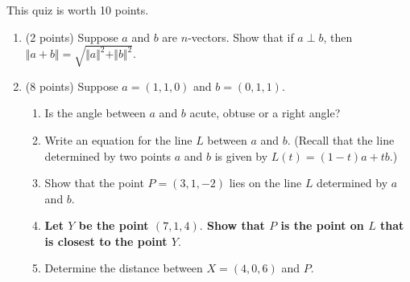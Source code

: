 \documentclass[11pt,fleqn]{article}
\begin{document}
\renewcommand{\headrulewidth}{0pt}
\newcommand{\blank}[1]{\rule{#1}{0.75pt}}
\renewcommand{\d}{\displaystyle}
This quiz is worth 10 points.
\begin{enumerate}
\item (2 points) Suppose $a$ and $b$ are $n$-vectors. Show that if $a \perp b$, then $\Vert a+b \Vert=\sqrt{\Vert a \Vert^2+\Vert b \Vert^2}.$
\vfill
\item (8 points) Suppose $a=(1,1,0)$ and $b=(0,1,1).$ 
 
	\begin{enumerate}
	\item Is the angle between $a$ and $b$ acute, obtuse or a right angle?
	\vspace{.5in}
	\item Write an equation for the line $L$ between $a$ and $b$. (Recall that the line determined by two points $a$ and $b$ is given by $L(t)=(1-t)a+tb.$)
	\vfill
	\item Show that the point $P=(3,1,-2)$ lies on the line $L$ determined by $a$ and $b.$
	\vfill 
	\item \textbf{Let $Y$ be the point $(7,1,4).$ Show that $P$ is the point on $L$ that is closest to the point $Y.$}
	\vfill
	\item Determine the distance between $X=(4,0,6)$ and $P.$
	\vfill
	\end{enumerate}
\end{enumerate}
\end{document}
